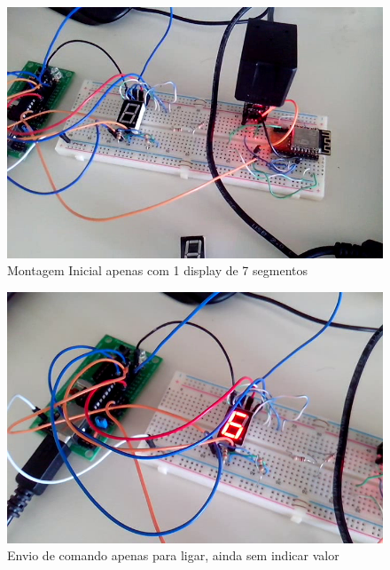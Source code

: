 \begin{figure}[h]
    \centering
    \includegraphics[scale=0.5]{img/vlcsnap-2016-10-20-16h24m17s640.png}
    \caption{Montagem Inicial apenas com 1 display de 7 segmentos}\label{fig:circuito1}
\end{figure}

\begin{figure}[h]
    \centering
    \includegraphics[scale=0.5]{img/vlcsnap-2016-10-20-16h24m03s183.png}
    \caption{Envio de comando apenas para ligar, ainda sem indicar valor}\label{fig:circuito2}
\end{figure}

